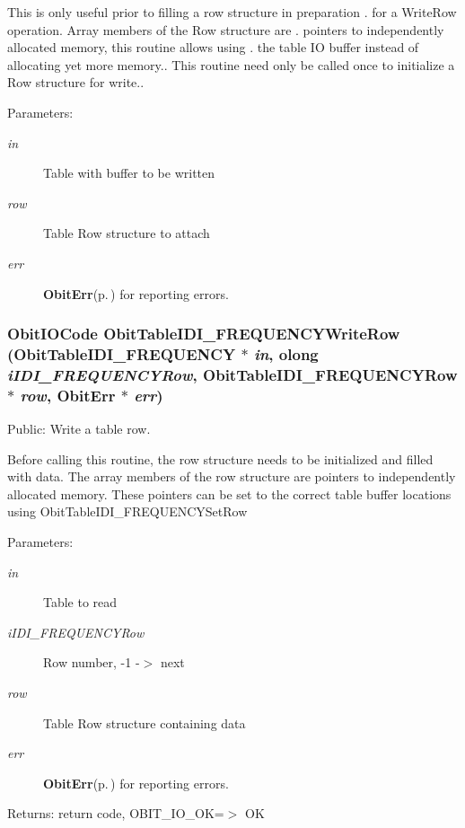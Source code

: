 This is only useful prior to filling a row structure in preparation . for a Write\-Row operation. Array members of the Row structure are . pointers to independently allocated memory, this routine allows using . the table IO buffer instead of allocating yet more memory.. This routine need only be called once to initialize a Row structure for write.. \begin{Desc}
\item[Parameters:]
\begin{description}
\item[{\em in}]Table with buffer to be written \item[{\em row}]Table Row structure to attach \item[{\em err}]{\bf Obit\-Err}{\rm (p.\,\pageref{structObitErr})} for reporting errors. \end{description}
\end{Desc}
\subsubsection{\setlength{\rightskip}{0pt plus 5cm}Obit\-IOCode Obit\-Table\-IDI\_\-FREQUENCYWrite\-Row ({\bf Obit\-Table\-IDI\_\-FREQUENCY} $\ast$ {\em in}, {\bf olong} {\em i\-IDI\_\-FREQUENCYRow}, {\bf Obit\-Table\-IDI\_\-FREQUENCYRow} $\ast$ {\em row}, {\bf Obit\-Err} $\ast$ {\em err})}\label{ObitTableIDI__FREQUENCY_8c_a24}


Public: Write a table row. 

Before calling this routine, the row structure needs to be initialized and filled with data. The array members of the row structure are pointers to independently allocated memory. These pointers can be set to the correct table buffer locations using Obit\-Table\-IDI\_\-FREQUENCYSet\-Row \begin{Desc}
\item[Parameters:]
\begin{description}
\item[{\em in}]Table to read \item[{\em i\-IDI\_\-FREQUENCYRow}]Row number, -1 -$>$ next \item[{\em row}]Table Row structure containing data \item[{\em err}]{\bf Obit\-Err}{\rm (p.\,\pageref{structObitErr})} for reporting errors. \end{description}
\end{Desc}
\begin{Desc}
\item[Returns:]return code, OBIT\_\-IO\_\-OK=$>$ OK \end{Desc}
